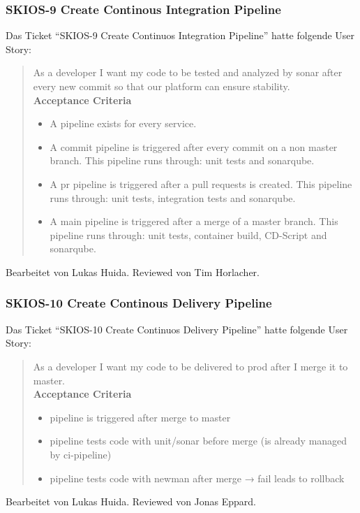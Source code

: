 \subsubsection{SKIOS-9 Create Continous Integration Pipeline}
Das Ticket \enquote{SKIOS-9 Create Continuos Integration Pipeline} hatte folgende User Story:
\begin{quotation}
    As a developer I want my code to be tested and analyzed by sonar after every new commit so that our platform can ensure stability. \\
    \textbf{Acceptance Criteria}
    \begin{itemize}
        \item A pipeline exists for every service.
        \item A commit pipeline is triggered after every commit on a non master branch. This pipeline runs through: unit tests and sonarqube.
        \item A pr pipeline is triggered after a pull requests is created. This pipeline runs through: unit tests, integration tests and sonarqube.
        \item A main pipeline is triggered after a merge of a master branch. This pipeline runs through: unit tests, container build, CD-Script and sonarqube.
    \end{itemize}
\end{quotation}
Bearbeitet von Lukas Huida.
Reviewed von Tim Horlacher.

\subsubsection{SKIOS-10 Create Continous Delivery Pipeline}
Das Ticket \enquote{SKIOS-10 Create Continuos Delivery Pipeline} hatte folgende User Story:
\begin{quotation}
    As a developer I want my code to be delivered to prod after I merge it to master. \\
    \textbf{Acceptance Criteria}
    \begin{itemize}
        \item pipeline is triggered after merge to master
        \item pipeline tests code with unit/sonar before merge (is already managed by ci-pipeline)
        \item pipeline tests code with newman after merge → fail leads to rollback
    \end{itemize}
\end{quotation}
Bearbeitet von Lukas Huida.
Reviewed von Jonas Eppard.


